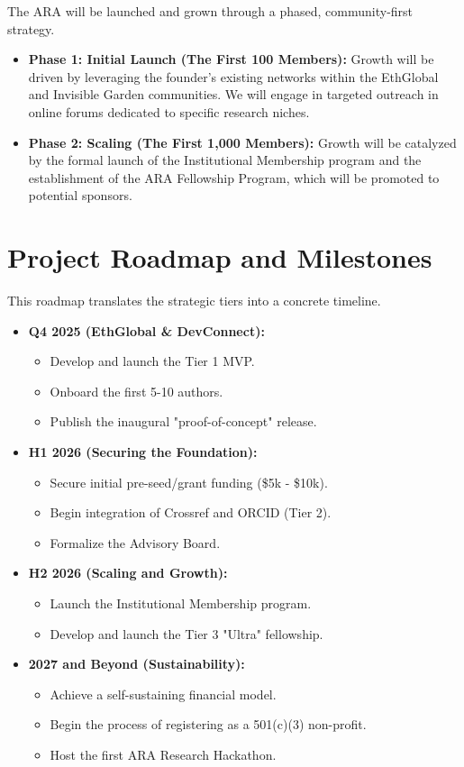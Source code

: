 \documentclass[conference, compsoc, 11pt]{IEEEtran}
\begin{document}
The ARA will be launched and grown through a phased, community-first strategy.
\begin{itemize}
    \item \textbf{Phase 1: Initial Launch (The First 100 Members):} Growth will be driven by leveraging the founder's existing networks within the EthGlobal and Invisible Garden communities. We will engage in targeted outreach in online forums dedicated to specific research niches.
    \item \textbf{Phase 2: Scaling (The First 1,000 Members):} Growth will be catalyzed by the formal launch of the Institutional Membership program and the establishment of the ARA Fellowship Program, which will be promoted to potential sponsors.
\end{itemize}

\section{Project Roadmap and Milestones}
This roadmap translates the strategic tiers into a concrete timeline.
\begin{itemize}
    \item \textbf{Q4 2025 (EthGlobal \& DevConnect):}
    \begin{itemize}
        \item Develop and launch the Tier 1 MVP.
        \item Onboard the first 5-10 authors.
        \item Publish the inaugural "proof-of-concept" release.
    \end{itemize}
    \item \textbf{H1 2026 (Securing the Foundation):}
    \begin{itemize}
        \item Secure initial pre-seed/grant funding (\$5k - \$10k).
        \item Begin integration of Crossref and ORCID (Tier 2).
        \item Formalize the Advisory Board.
    \end{itemize}
    \item \textbf{H2 2026 (Scaling and Growth):}
    \begin{itemize}
        \item Launch the Institutional Membership program.
        \item Develop and launch the Tier 3 "Ultra" fellowship.
    \end{itemize}
    \item \textbf{2027 and Beyond (Sustainability):}
    \begin{itemize}
        \item Achieve a self-sustaining financial model.
        \item Begin the process of registering as a 501(c)(3) non-profit.
        \item Host the first ARA Research Hackathon.
    \end{itemize}
\end{itemize}
\end{document}
